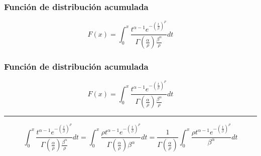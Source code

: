 \begin{frame}
    \frametitle{Función de distribución acumulada}

    \begin{equation*}
        F(x) = \int_{0}^{x} \frac{t^{\alpha - 1} e^{-\left(\frac{t}{\beta}\right)^{\rho}}}{\Gamma \left( \frac{\alpha}{\rho} \right) \frac{\beta^\alpha}{\rho}} dt
    \end{equation*}
\end{frame}

\begin{frame}
    \frametitle{Función de distribución acumulada}

    \begin{equation*}
        F(x) = \int_{0}^{x} \frac{t^{\alpha - 1} e^{-\left(\frac{t}{\beta}\right)^{\rho}}}{\Gamma \left( \frac{\alpha}{\rho} \right) \frac{\beta^\alpha}{\rho}} dt
    \end{equation*}

    \hrule
    \vspace{0.5cm}

    \begin{equation*}
        \int_{0}^{x} \frac{t^{\alpha - 1} e^{-\left(\frac{t}{\beta}\right)^{\rho}}}{\Gamma \left( \frac{\alpha}{\rho} \right) \frac{\beta^\alpha}{\rho}} dt
        = \int_{0}^{x} \frac{\rho t^{\alpha - 1} e^{-\left(\frac{t}{\beta}\right)^{\rho}}}{\Gamma \left( \frac{\alpha}{\rho} \right) \beta^\alpha} dt
        = \frac{1}{\Gamma \left( \frac{\alpha}{\rho} \right)}\int_{0}^{x} \frac{\rho t^{\alpha - 1} e^{-\left(\frac{t}{\beta}\right)^{\rho}}}{\beta^\alpha} dt
    \end{equation*}
\end{frame}

